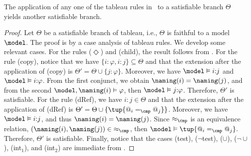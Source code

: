 \begin{lem}
    \label{lemma:soundness}
    The application of any one of the tableau rules in~ to a satisfiable branch $\Theta$ yields another satisfiable branch.
\end{lem}

\begin{proof}
    Let $\Theta$ be a satisfiable branch of tableau,  i.e.,
    $\Theta$ is faithful to a model $\model$.
    The proof is by a case analysis of tableau rules.
    We develop some relevant cases.
    For the rules ($\Diamond$) and (child), the result follows from .
    For the rule (copy), notice that we have $\{i{:}\varphi, i{:}j\} \subseteq \Theta$ and that the extension after the application of (copy) is $\Theta' = \Theta \cup \{j{:}\varphi\}$.
    Moreover, we have $\model \vDash i{:}j$ and $\model \vDash i{:}\varphi$.
    From the first conjunct, we obtain $\naming(i) = \naming(j)$, and from the second $\model, \naming(i) \vDash \varphi$, 
    then $\model \vDash j{:}\varphi$.
    Therefore, $\Theta'$ is satisfiable.
    For the rule (dRef),
    we have $i{:}j \in \Theta$ and that the extension after the application of (dRef) is $\Theta' = \Theta \cup \{\tup{@_i =_{\cmp} @_j}\}$.
    Moreover, we have $\model \vDash i{:}j$, and thus $\naming(i) = \naming(j)$.
    Since $\approx_{\cmp}$ is an equivalence relation, $(\naming(i), \naming(j)) \in {\approx_{\cmp}}$, then $\model \vDash \tup{@_i =_{\cmp} @_j}$.
    Therefore, $\Theta'$ is satisfiable.
    Finally, notice that the cases (test), ($\lnot$test), ($\cup$), (${\lnot}{\cup}$), (int$_1$), and (int$_2$) are immediate from .
\end{proof} 

